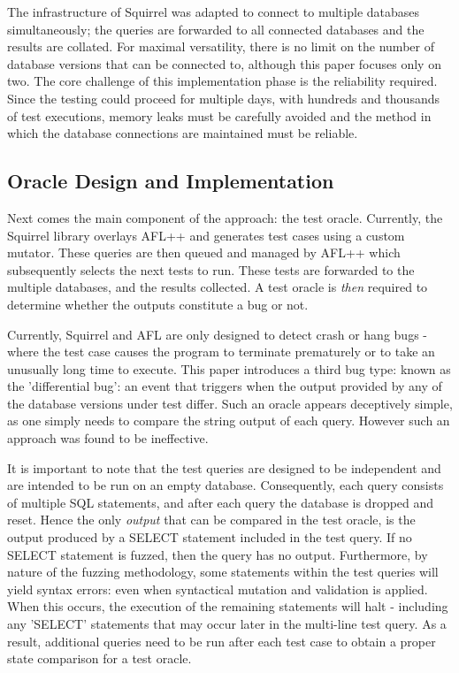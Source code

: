 \documentclass[sigconf]{acmart}
\begin{document}
The infrastructure of Squirrel was adapted to connect to multiple databases simultaneously; the queries are forwarded to all connected databases and the results are collated. For maximal versatility, there is no limit on the number of database versions that can be connected to, although this paper focuses only on two. The core challenge of this implementation phase is the reliability required. Since the testing could proceed for multiple days, with hundreds and thousands of test executions, memory leaks must be carefully avoided and the method in which the database connections are maintained must be reliable.

\subsection{Oracle Design and Implementation}
\label{lab:test_oracle}
Next comes the main component of the approach: the test oracle. Currently, the Squirrel library overlays AFL++ and generates test cases using a custom mutator. These queries are then queued and managed by AFL++ which subsequently selects the next tests to run. These tests are forwarded to the multiple databases, and the results collected. A test oracle is \textit{then} required to determine whether the outputs constitute a bug or not. 

Currently, Squirrel and AFL are only designed to detect crash or hang bugs - where the test case causes the program to terminate prematurely or to take an unusually long time to execute. This paper introduces a third bug type: known as the 'differential bug': an event that triggers when the output provided by any of the database versions under test differ. Such an oracle appears deceptively simple, as one simply needs to compare the string output of each query. However such an approach was found to be ineffective.

It is important to note that the test queries are designed to be independent and are intended to be run on an empty database. Consequently, each query consists of multiple SQL statements, and after each query the database is dropped and reset. Hence the only \textit{output} that can be compared in the test oracle, is the output produced by a SELECT statement included in the test query. If no SELECT statement is fuzzed, then the query has no output. Furthermore, by nature of the fuzzing methodology, some statements within the test queries will yield syntax errors: even when syntactical mutation and validation is applied. When this occurs, the execution of the remaining statements will halt - including any 'SELECT' statements that may occur later in the multi-line test query. As a result, additional queries need to be run after each test case to obtain a proper state comparison for a test oracle.
\end{document}
